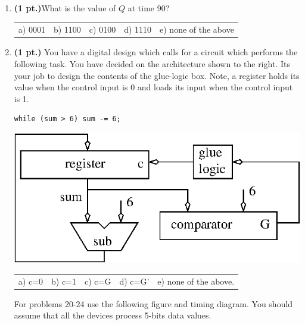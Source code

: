 \documentclass{article}
\begin{document}
\begin{enumerate}
\item {\bf (1 pt.)}What is the value of $Q$ at time 90?

\begin{tabular}{p{0.6in} p{0.6in} p{0.6in} p{0.6in} l}
a) 0001 & b) 1100 & c) 0100 & d) 1110 & e) none of the above
\end{tabular}

\item {\bf (1 pt.)} You have a digital design which calls for a circuit
which performs the following task.  You have decided on the architecture
shown to the right.  Its your job to design the contents of the glue-logic
box. Note, a register holds its value when the control input is 0 and 
loads its input when the control input is 1.

\begin{verbatim}
while (sum > 6) sum -= 6;
\end{verbatim}

\includegraphics{./Fig2/while6}

\begin{tabular}{p{0.6in} p{0.6in} p{0.6in} p{0.6in} l}
a) c=0 & b) c=1 & c) c=G & d) c=G' & e) none of the above.  
\end{tabular}

\pagebreak
For problems 20-24 use the following figure and timing diagram.
You should assume that all the devices process 5-bits data 
values.


\end{enumerate}
\end{document}
